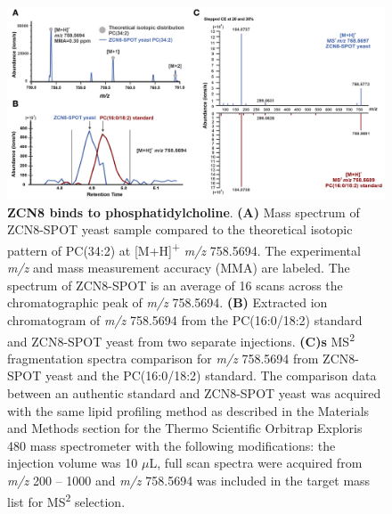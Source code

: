 \begin{subappendices}
\begin{figure}[t]
\begin{center}
\includegraphics[width=\linewidth]{Sup_Figures/Sup_Fig_14.png}
\caption[ZCN8 binds to phosphatidylcholine.]
{ \textbf{ZCN8 binds to phosphatidylcholine}.
\textbf{(A)} Mass spectrum of ZCN8-SPOT yeast sample compared to the theoretical isotopic pattern of PC(34:2) at [M+H]\textsuperscript{+} \textit{m/z} 758.5694. The experimental \textit{m/z} and mass measurement accuracy (MMA) are labeled. The spectrum of ZCN8-SPOT is an average of 16 scans across the chromatographic peak of \textit{m/z} 758.5694.  
\textbf{(B)} Extracted ion chromatogram of \textit{m/z} 758.5694 from the PC(16:0/18:2) standard and ZCN8-SPOT yeast from two separate injections.  
\textbf{(C)s} MS\textsuperscript{2} fragmentation spectra comparison for \textit{m/z} 758.5694 from ZCN8-SPOT yeast and the PC(16:0/18:2) standard.
The comparison data between an authentic standard and ZCN8-SPOT yeast was acquired with the same lipid profiling method as described in the Materials and Methods section for the Thermo Scientific Orbitrap Exploris 480 mass spectrometer with the following modifications:  the injection volume was 10 $\mu$L, full scan spectra were acquired from \textit{m/z} 200 – 1000 and \textit{m/z} 758.5694 was included in the target mass
list for MS\textsuperscript{2} selection.}
\label{figure:Sup:ZCN8-PC}
\end{center}
\end{figure}

\end{subappendices}
